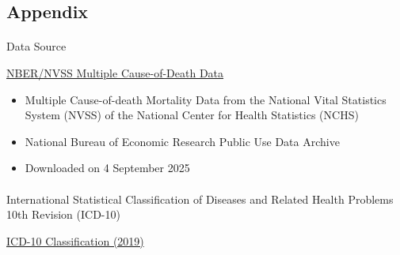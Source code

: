 \documentclass[
  letterpaper,
  DIV=11,
  numbers=noendperiod]{scrartcl}
\makeatletter
\let\oldparagraph\paragraph
\renewcommand{\paragraph}{
    \@ifstar
      \xxxParagraphStar
      \xxxParagraphNoStar
  }
\newcommand{\xxxParagraphStar}[1]{\oldparagraph*{#1}\mbox{}}
\newcommand{\xxxParagraphNoStar}[1]{\oldparagraph{#1}\mbox{}}
\providecommand{\tightlist}{%
  \setlength{\itemsep}{0pt}\setlength{\parskip}{0pt}}
\makeatother
\begin{document}
\subsection{Appendix}\label{appendix}

\paragraph{Data Source}\label{data-source}

\href{https://www.nber.org/research/data/mortality-data-vital-statistics-nchs-multiple-cause-death-data}{NBER/NVSS
Multiple Cause-of-Death Data}

\begin{itemize}
\tightlist
\item
  Multiple Cause-of-death Mortality Data from the National Vital
  Statistics System (NVSS) of the National Center for Health Statistics
  (NCHS)
\item
  National Bureau of Economic Research Public Use Data Archive
\item
  Downloaded on 4 September 2025
\end{itemize}

\paragraph{International Statistical Classification of Diseases and
Related Health Problems 10th Revision
(ICD-10)}\label{international-statistical-classification-of-diseases-and-related-health-problems-10th-revision-icd-10}

\href{https://icd.who.int/browse10/2019/en}{ICD-10 Classification
(2019)}
\end{document}
